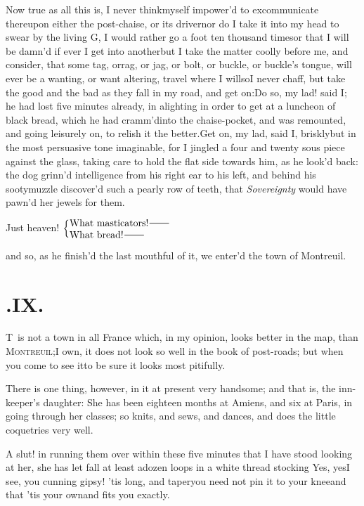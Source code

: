 \documentclass{article}
\begin{document}
Now true as all this is, I never think\break myself impower’d to
excommunicate thereupon either the post-chaise, or its
driver\tsh nor do I take it into my head to swear by the
living G\tsk, I would rather go a foot ten thousand
times\tsh or that I will be damn’d if ever I get
into another\tsh but I take the matter coolly
before me, and consider, that some tag, or\pb rag, or jag, or bolt, or
buckle, or buckle’s tongue, will ever be a wanting, or want
altering, travel where I will\tsk so\break I never chaff, but take the
good and the bad as they fall in my road, and get
on:\tsh Do so, my lad! said I; he had lost five minutes
already, in alighting in order to get at a luncheon of black bread,
which he had cramm’d\break into the chaise-pocket, and was
remounted, and going leisurely on, to relish it the
better.\tsh Get on, my lad, said I, briskly\tsk but in
the most persuasive tone imaginable, for I jingled a
four and twenty sous piece against the glass, taking care to hold
the flat side towards him, as he look’d back: the dog
grinn’d intelligence from his right ear to his left, and
behind his sooty\pb muzzle discover’d such a pearly row of teeth, that
\textit{Sovereignty} would have pawn’d her jewels for
them.\tsh

\noindent
Just heaven! $\displaystyle\left\{\vcenter{\halign{#\hss\cr What masticators!\tsh\cr What bread!\tsh\cr}}\right.$

\noindent
and so, as he finish’d the last mouthful of it, we
enter’d the town of Montreuil.

\newpage
\section{.\enspace IX.}

\lettrine{T}{\,} is not a town in all France which, in my opinion, looks better in the
map, than \textsc{Montreuil};\tsh I own, it does not look so well in the book of
post-roads; but when you come to see it\tsk to be sure it looks most pitifully.

There is one thing, however, in it at present very handsome; and that is, the
inn-keeper’s daughter: She has been eighteen months at Amiens, and six at
Paris, in going through her classes; so knits, and sews, and dances, and
does the little coquetries very well.\tsh

\tsk A slut! in running them over with\-in these five minutes
that I have stood looking at her, she has let fall at least a\pb dozen
loops in a white thread stocking\break
\tsh Yes, yes\tsk I see, you cunning gipsy!\break
\tsk ’tis long, and taper\tsk you need
not pin it to your knee\tsk and that ’tis your
own\tsk and fits you exactly.\tsh
\end{document}
